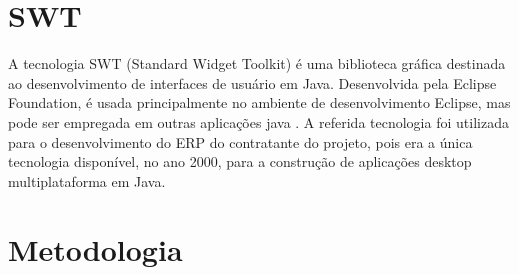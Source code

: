 \section{SWT}

A tecnologia SWT (Standard Widget Toolkit) é uma biblioteca gráfica destinada ao desenvolvimento de interfaces de usuário em Java. Desenvolvida pela Eclipse Foundation, é usada principalmente no ambiente de desenvolvimento Eclipse, mas pode ser empregada em outras aplicações java \cite{swt:explicacao}. 
A referida tecnologia foi utilizada para o desenvolvimento do ERP do contratante do projeto, pois era a única tecnologia disponível, no ano 2000, para a construção de aplicações desktop multiplataforma em Java.

\section{Metodologia}

